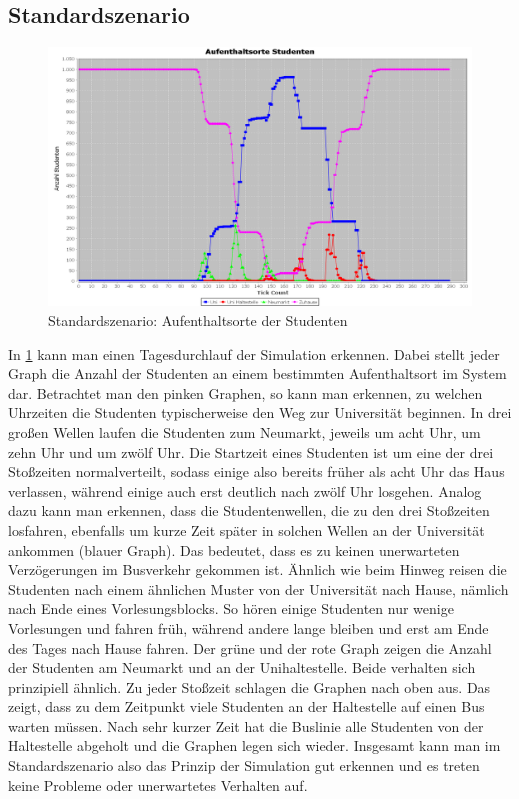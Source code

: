 \documentclass[12pt,a4paper]{scrartcl}
\begin{document}

\subsection{Standardszenario}\label{s1}
\begin{figure}
\includegraphics[scale=0.4]{Standardszenario_Aufenthaltsorte.png}
\caption{Standardszenario: Aufenthaltsorte der Studenten}
\label{s1g1}
\end{figure}

In \ref{s1g1} kann man einen Tagesdurchlauf der Simulation erkennen. Dabei stellt jeder Graph die Anzahl der Studenten an einem bestimmten Aufenthaltsort im System dar. Betrachtet man den pinken Graphen, so kann man erkennen, zu welchen Uhrzeiten die Studenten typischerweise den Weg zur Universität beginnen. In drei großen Wellen laufen die Studenten zum Neumarkt, jeweils um acht Uhr, um zehn Uhr und um zwölf Uhr. Die Startzeit eines Studenten ist um eine der drei Stoßzeiten normalverteilt, sodass einige also bereits früher als acht Uhr das Haus verlassen, während einige auch erst deutlich nach zwölf Uhr losgehen. 
Analog dazu kann man erkennen, dass die Studentenwellen, die zu den drei Stoßzeiten losfahren, ebenfalls um kurze Zeit später in solchen Wellen an der Universität ankommen (blauer Graph). Das bedeutet, dass es zu keinen unerwarteten Verzögerungen im Busverkehr gekommen ist. Ähnlich wie beim Hinweg reisen die Studenten nach einem ähnlichen Muster von der Universität nach Hause, nämlich nach Ende eines Vorlesungsblocks. So hören einige Studenten nur wenige Vorlesungen und fahren früh, während andere lange bleiben und erst am Ende des Tages nach Hause fahren. 
Der grüne und der rote Graph zeigen die Anzahl der Studenten am Neumarkt und an der Unihaltestelle. Beide verhalten sich prinzipiell ähnlich. Zu jeder Stoßzeit schlagen die Graphen nach oben aus. Das zeigt, dass zu dem Zeitpunkt viele Studenten an der Haltestelle auf einen Bus warten müssen. Nach sehr kurzer Zeit hat die Buslinie alle Studenten von der Haltestelle abgeholt und die Graphen legen sich wieder.
Insgesamt kann man im Standardszenario also das Prinzip der Simulation gut erkennen und es treten keine Probleme oder unerwartetes Verhalten auf.
\end{document}
